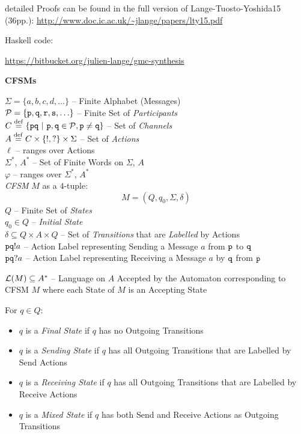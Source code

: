 detailed Proofs can be found in the full version of
Lange-Tuosto-Yoshida15 (36pp.):
\url{http://www.doc.ic.ac.uk/~jlange/papers/lty15.pdf}

Haskell code:

\url{https://bitbucket.org/julien-lange/gmc-synthesis}


\textbf{CFSMs}

$\Sigma = \{ a,b,c,d,\ldots \}$ -- Finite Alphabet (Messages) \\
$\mathcal{P} = \{ \mathtt{p, q, r, s},\ldots\}$
-- Finite Set of \emph{Participants} \\
$C \stackrel{\mathrm{def}}= \{ \mathtt{pq}
  \ |\ \mathtt{p,q} \in \mathcal{P}, \mathtt{p \neq q} \}$
-- Set of \emph{Channels} \\
$A \stackrel{\mathrm{def}}= C \times \{!,?\} \times \Sigma$ -- Set of \emph{Actions} \\
$\ell$ -- ranges over Actions \\
$\Sigma^*$, $A^*$ -- Set of Finite Words on $\Sigma$, $A$ \\
$\varphi$ -- ranges over $\Sigma^*$, $A^*$ \\

\emph{CFSM} $M$ as a $4$-tuple:
\[
  M = (Q, q_0, \Sigma, \delta)
\]
$Q$ -- Finite Set of \emph{States} \\
$q_0 \in Q$ -- \emph{Initial State} \\
$\delta \subseteq Q \times A \times Q$ -- Set of \emph{Transitions}
that are \emph{Labelled} by Actions \\

$\mathtt{pq}!a$ -- Action Label representing Sending a Message $a$ from
$\mathtt{p}$ to $\mathtt{q}$ \\
$\mathtt{pq}?a$ -- Action Label representing Receiving a Message $a$ by
$\mathtt{q}$ from $\mathtt{p}$

$\mathcal{L}(M) \subseteq A^*$ -- Language on $A$ Accepted by the
Automaton corresponding to CFSM $M$ where each State of $M$ is an
Accepting State %

For $q \in Q$:
\begin{itemize}
  \item $q$ is a \emph{Final State} if $q$ has no Outgoing Transitions
  \item $q$ is a \emph{Sending State} if $q$ has all Outgoing
    Transitions that are Labelled by Send Actions
  \item $q$ is a \emph{Receiving State} if $q$ has all Outgoing
    Transitions that are Labelled by Receive Actions
  \item $q$ is a \emph{Mixed State} if $q$ has both Send and
    Receive Actions as Outgoing Transitions
\end{itemize}

